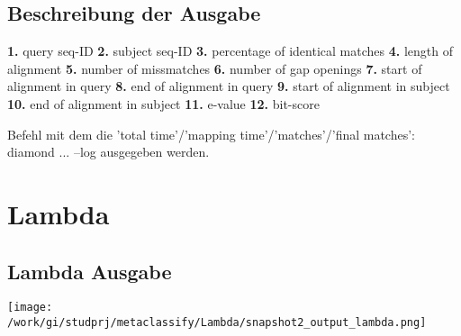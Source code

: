 \documentclass[11pt, a4paper]{scrartcl}
\begin{document}
\begin{flushleft}
\subsection{Beschreibung der Ausgabe}
\begin{flushleft}
\textbf{1.} query seq-ID\linebreak
\textbf{2.} subject seq-ID\linebreak
\textbf{3.} percentage of identical matches\linebreak
\textbf{4.} length of alignment\linebreak
\textbf{5.} number of missmatches\linebreak
\textbf{6.} number of gap openings\linebreak
\textbf{7.} start of alignment in query\linebreak
\textbf{8.} end of alignment in query\linebreak
\textbf{9.} start of alignment in subject\linebreak
\textbf{10.} end of alignment in subject\linebreak
\textbf{11.} e-value\linebreak
\textbf{12.} bit-score
\end{flushleft}

Befehl mit dem die 'total time'/'mapping time'/'matches'/'final matches':
\color{red}diamond ... --log \color{black} ausgegeben werden.

\newpage

\section{Lambda}

\subsection{Lambda Ausgabe}
\texttt{[image: /work/gi/studprj/metaclassify/Lambda/snapshot2\_output\_lambda.png]}


\end{flushleft}
\end{document}
